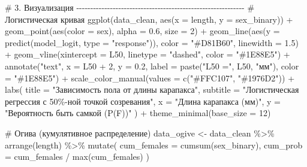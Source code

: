 \documentclass[
  letterpaper,
  DIV=11,
  numbers=noendperiod]{scrreprt}
\newenvironment{Shaded}{\begin{snugshade}}{\end{snugshade}}
\newcommand{\AttributeTok}[1]{\textcolor[rgb]{0.40,0.45,0.13}{#1}}
\newcommand{\CommentTok}[1]{\textcolor[rgb]{0.37,0.37,0.37}{#1}}
\newcommand{\DecValTok}[1]{\textcolor[rgb]{0.68,0.00,0.00}{#1}}
\newcommand{\FloatTok}[1]{\textcolor[rgb]{0.68,0.00,0.00}{#1}}
\newcommand{\FunctionTok}[1]{\textcolor[rgb]{0.28,0.35,0.67}{#1}}
\newcommand{\NormalTok}[1]{\textcolor[rgb]{0.00,0.23,0.31}{#1}}
\newcommand{\OtherTok}[1]{\textcolor[rgb]{0.00,0.23,0.31}{#1}}
\newcommand{\SpecialCharTok}[1]{\textcolor[rgb]{0.37,0.37,0.37}{#1}}
\newcommand{\StringTok}[1]{\textcolor[rgb]{0.13,0.47,0.30}{#1}}
\begin{document}
\begin{Shaded}
\begin{Highlighting}[]
\CommentTok{\# 3. Визуализация {-}{-}{-}{-}{-}{-}{-}{-}{-}{-}{-}{-}{-}{-}{-}{-}{-}{-}{-}{-}{-}{-}{-}{-}{-}{-}{-}{-}{-}{-}{-}{-}{-}{-}{-}{-}{-}{-}{-}{-}{-}{-}{-}{-}{-}{-}{-}{-}{-}{-}{-}{-}{-}{-}{-}{-}{-}{-}{-}{-}}
\CommentTok{\# Логистическая кривая}
\FunctionTok{ggplot}\NormalTok{(data\_clean, }\FunctionTok{aes}\NormalTok{(}\AttributeTok{x =}\NormalTok{ length, }\AttributeTok{y =}\NormalTok{ sex\_binary)) }\SpecialCharTok{+}
  \FunctionTok{geom\_point}\NormalTok{(}\FunctionTok{aes}\NormalTok{(}\AttributeTok{color =}\NormalTok{ sex), }\AttributeTok{alpha =} \FloatTok{0.6}\NormalTok{, }\AttributeTok{size =} \DecValTok{2}\NormalTok{) }\SpecialCharTok{+}
  \FunctionTok{geom\_line}\NormalTok{(}\FunctionTok{aes}\NormalTok{(}\AttributeTok{y =} \FunctionTok{predict}\NormalTok{(model\_logit, }\AttributeTok{type =} \StringTok{"response"}\NormalTok{)), }
            \AttributeTok{color =} \StringTok{"\#D81B60"}\NormalTok{, }\AttributeTok{linewidth =} \FloatTok{1.5}\NormalTok{) }\SpecialCharTok{+}
  \FunctionTok{geom\_vline}\NormalTok{(}\AttributeTok{xintercept =}\NormalTok{ L50, }\AttributeTok{linetype =} \StringTok{"dashed"}\NormalTok{, }\AttributeTok{color =} \StringTok{"\#1E88E5"}\NormalTok{) }\SpecialCharTok{+}
  \FunctionTok{annotate}\NormalTok{(}\StringTok{"text"}\NormalTok{, }\AttributeTok{x =}\NormalTok{ L50 }\SpecialCharTok{+} \DecValTok{2}\NormalTok{, }\AttributeTok{y =} \FloatTok{0.2}\NormalTok{, }
           \AttributeTok{label =} \FunctionTok{paste}\NormalTok{(}\StringTok{"L50 ="}\NormalTok{, L50, }\StringTok{"мм"}\NormalTok{), }\AttributeTok{color =} \StringTok{"\#1E88E5"}\NormalTok{) }\SpecialCharTok{+}
  \FunctionTok{scale\_color\_manual}\NormalTok{(}\AttributeTok{values =} \FunctionTok{c}\NormalTok{(}\StringTok{"\#FFC107"}\NormalTok{, }\StringTok{"\#1976D2"}\NormalTok{)) }\SpecialCharTok{+}
  \FunctionTok{labs}\NormalTok{(}
    \AttributeTok{title =} \StringTok{"Зависимость пола от длины карапакса"}\NormalTok{,}
    \AttributeTok{subtitle =} \StringTok{"Логистическая регрессия с 50\%{-}ной точкой созревания"}\NormalTok{,}
    \AttributeTok{x =} \StringTok{"Длина карапакса (мм)"}\NormalTok{,}
    \AttributeTok{y =} \StringTok{"Вероятность быть самкой (P(F))"}
\NormalTok{  ) }\SpecialCharTok{+}
  \FunctionTok{theme\_minimal}\NormalTok{(}\AttributeTok{base\_size =} \DecValTok{12}\NormalTok{)}

\CommentTok{\# Огива (кумулятивное распределение)}
\NormalTok{data\_ogive }\OtherTok{\textless{}{-}}\NormalTok{ data\_clean }\SpecialCharTok{\%\textgreater{}\%}
  \FunctionTok{arrange}\NormalTok{(length) }\SpecialCharTok{\%\textgreater{}\%}
  \FunctionTok{mutate}\NormalTok{(}
    \AttributeTok{cum\_females =} \FunctionTok{cumsum}\NormalTok{(sex\_binary),}
    \AttributeTok{cum\_prob =}\NormalTok{ cum\_females }\SpecialCharTok{/} \FunctionTok{max}\NormalTok{(cum\_females)}
\NormalTok{  )}


\end{Highlighting}
\end{Shaded}
\end{document}
